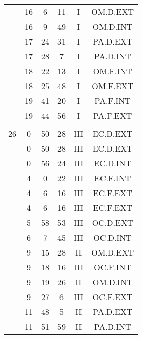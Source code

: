 \documentclass[12pt, a4paper]{article}
\begin{document}
\begin{multicols}{3}
{\begin{tabular}{c c c c c c}
	 	 	 	 & 16 & 6 & 11 & I & OM.D.EXT\\%
	 	 	 	 & 16 & 9 & 49 & I & OM.D.INT\\%
	 	 	 	 & 17 & 24 & 31 & I & PA.D.EXT\\%
	 	 	 	 & 17 & 28 & 7 & I & PA.D.INT\\%
	 	 	 	 & 18 & 22 & 13 & I & OM.F.INT\\%
	 	 	 	 & 18 & 25 & 48 & I & OM.F.EXT\\%
	 	 	 	 & 19 & 41 & 20 & I & PA.F.INT\\%
	 	 	 	 & 19 & 44 & 56 & I & PA.F.EXT\\%
	 	 	 	 & & & & & \\%
	 	 	 	26 & 0 & 50 & 28 & III & EC.D.EXT\\%
	 	 	 	 & 0 & 50 & 28 & III & EC.D.EXT\\%
	 	 	 	 & 0 & 56 & 24 & III & EC.D.INT\\%
	 	 	 	 & 4 & 0 & 22 & III & EC.F.INT\\%
	 	 	 	 & 4 & 6 & 16 & III & EC.F.EXT\\%
	 	 	 	 & 4 & 6 & 16 & III & EC.F.EXT\\%
	 	 	 	 & 5 & 58 & 53 & III & OC.D.EXT\\%
	 	 	 	 & 6 & 7 & 45 & III & OC.D.INT\\%
	 	 	 	 & 9 & 15 & 28 & II & OM.D.EXT\\%
	 	 	 	 & 9 & 18 & 16 & III & OC.F.INT\\%
	 	 	 	 & 9 & 19 & 26 & II & OM.D.INT\\%
	 	 	 	 & 9 & 27 & 6 & III & OC.F.EXT\\%
	 	 	 	 & 11 & 48 & 5 & II & PA.D.EXT\\%
	 	 	 	 & 11 & 51 & 59 & II & PA.D.INT\\%

\end{tabular}}
\end{multicols}
\end{document}
